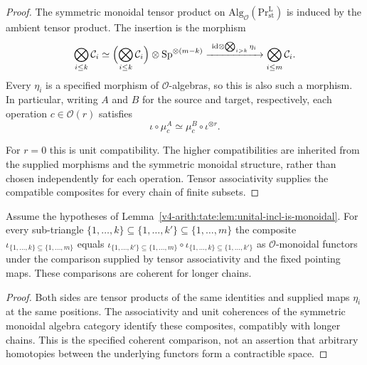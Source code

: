 \begin{proof}
The symmetric monoidal tensor product on
\(\mathrm{Alg}_{\mathcal O}(\mathrm{Pr}^{\mathrm L}_{\mathrm{st}})\)
is induced by the ambient tensor product. The insertion is the
morphism
\[
 \bigotimes_{i\leq k}\mathcal C_i
 \simeq
 \Bigl(\bigotimes_{i\leq k}\mathcal C_i\Bigr)
       \otimes\mathrm{Sp}^{\otimes(m-k)}
 \xrightarrow{\ \mathrm{id}\otimes\bigotimes_{i>k}\eta_i\ }
 \bigotimes_{i\leq m}\mathcal C_i.
\]
Every \(\eta_i\) is a specified morphism of \(\mathcal O\)-algebras,
so this is also such a morphism. In particular, writing \(A\) and
\(B\) for the source and target, respectively, each operation
\(c\in\mathcal O(r)\) satisfies
\begin{equation}
\label{v4-arith:tate:eq:unital-incl-commute}
 \iota\circ\mu_c^A\simeq\mu_c^B\circ\iota^{\otimes r}.
\end{equation}

For \(r=0\) this is unit compatibility. The higher compatibilities
are inherited from the supplied morphisms and the symmetric
monoidal structure, rather than chosen independently for each
operation. Tensor associativity supplies the compatible
composites for every chain of finite subsets.
\end{proof}

\begin{corollary}
\label{v4-arith:tate:cor:iota-restriction}
\ClaimStatusProvedHere Assume the hypotheses of
Lemma~\ref{v4-arith:tate:lem:unital-incl-is-monoidal}. For every
sub-triangle \(\{1,\ldots,k\}\subseteq\{1,\ldots,k'\}\subseteq\{1,\ldots,m\}\)
the composite \(\iota_{\{1,\ldots,k\}\subseteq\{1,\ldots,m\}}\) equals
\(\iota_{\{1,\ldots,k'\}\subseteq\{1,\ldots,m\}}\circ\iota_{\{1,\ldots,k\}\subseteq\{1,\ldots,k'\}}\)
as \(\mathcal{O}\)-monoidal functors under the comparison supplied
by tensor associativity and the fixed pointing maps. These
comparisons are coherent for longer chains.
\end{corollary}

\begin{proof}
Both sides are tensor products of the same identities and supplied
maps \(\eta_i\) at the same positions. The associativity and unit
coherences of the symmetric monoidal algebra category identify
these composites, compatibly with longer chains. This is the
specified coherent comparison, not an assertion that arbitrary
homotopies between the underlying functors form a contractible
space.
\end{proof}

